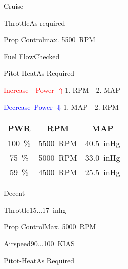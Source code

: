 \begin{checklist}{Cruise}
  \item{Throttle}{As required}
  \item{Prop Control}{max. 5500~RPM}
  \item{Fuel Flow}{Checked}
  \item{Pitot Heat}{As Required}

  \item{\textcolor{red}{Increase~~Power $\Uparrow$}}{1. RPM - 2. MAP}
  \item{\textcolor{blue}{Decrease~Power $\Downarrow$}}{1. MAP - 2. RPM}
    
\end{checklist}

\begin{table}[!ht]
  \large
  \centering
  \begin{tabular}{|c|c|c|}
  \hline
  \cellcolor{black!90}\color{white}\textbf{PWR} & \cellcolor{black!90}\color{white}\textbf{RPM}  & \cellcolor{black!90}\color{white}\textbf{MAP} \\ \hline

  100~\% & 5500~RPM & 40.5~inHg \\ \hline
  75~\% & 5000~RPM & 33.0~inHg \\ \hline
  59~\% & 4500~RPM & 25.5~inHg \\ \hline

  \end{tabular}
\end{table}


\begin{checklist}{Decent}
  \item{Throttle}{15...17~inhg}
  \item{Prop Control}{Max. 5000~RPM}
  \item{Airspeed}{90...100~KIAS}
  \item{Pitot-Heat}{As Required}
\end{checklist}

